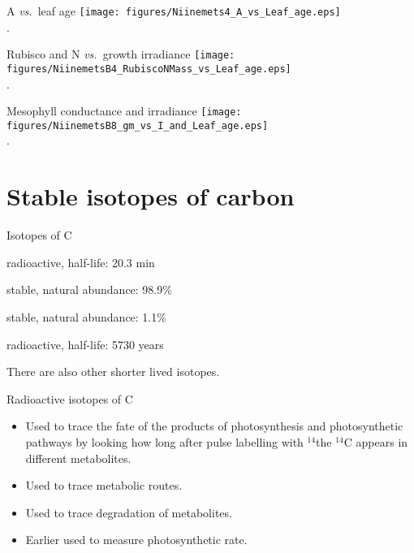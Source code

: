 \documentclass[10pt]{beamer}
\begin{document}
\begin{frame}{A \textit{vs.}\ leaf age}
    \centering
    \texttt{[image: figures/Niinemets4\_A\_vs\_Leaf\_age.eps]}\\
    {\small \autocite[from][]{Niinemets2005b}.}
\end{frame}

\begin{frame}{Rubisco and N \textit{vs.}\ growth irradiance}
    \centering
    \texttt{[image: figures/NiinemetsB4\_RubiscoNMass\_vs\_Leaf\_age.eps]}\\
    {\small \autocite[from][]{Niinemets2007c}.}
\end{frame}

\begin{frame}{Mesophyll conductance and irradiance}
    \centering
    \texttt{[image: figures/NiinemetsB8\_gm\_vs\_I\_and\_Leaf\_age.eps]}\\
    {\small \autocite[from][]{Niinemets2007c}.}
\end{frame}


\section{Stable isotopes of carbon}

\begin{frame}{Isotopes of C}
    \begin{description}
        \item[$^{11}$C] radioactive, half-life: 20.3 min
        \item[$^{12}$C] stable, natural abundance: 98.9\%
        \item[$^{13}$C] stable, natural abundance:  1.1\%
        \item[$^{14}$C] radioactive, half-life: 5730 years
        \item There are also other shorter lived isotopes.
    \end{description}
\end{frame}

\begin{frame}{Radioactive isotopes of C}
    \begin{itemize}
        \item Used to trace the fate of the products of photosynthesis and photosynthetic pathways by looking how long after pulse labelling with $^{14}$\COtwo the $^{14}$C appears in different metabolites.
        \item Used to trace metabolic routes.
        \item Used to trace degradation of metabolites.
        \item Earlier used to measure photosynthetic rate.
    \end{itemize}
\end{frame}
\end{document}
